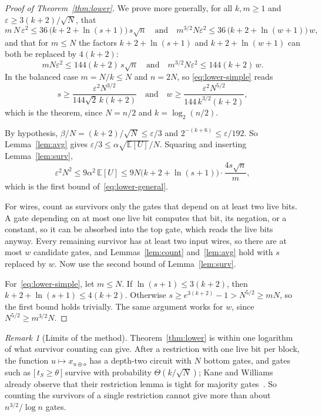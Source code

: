 \documentclass[11pt,letterpaper]{article}
\theoremstyle{remark}
\newtheorem*{remark}{Remark}
\newcommand{\ind}[1]{\bigl[\,#1\,\bigr]}
\begin{document}
\begin{proof}[Proof of Theorem~\ref{thm:lower}]
We prove more generally, for all $k,m\ge1$ and
$\varepsilon\ge3(k+2)/\sqrt N$, that
\begin{equation}\label{eq:lower-general}
m\,N\,\varepsilon^2\le 36\,\bigl(k+2+\ln(s+1)\bigr)\,s\sqrt n
\quad\text{and}\quad
m^{3/2}N\varepsilon^2\le 36\,\bigl(k+2+\ln(w+1)\bigr)\,w ,
\end{equation}
and that for $m\le N$ the factors $k+2+\ln(s+1)$ and $k+2+\ln(w+1)$ can
both be replaced by $4(k+2)$:
\begin{equation}\label{eq:lower-simple}
mN\varepsilon^2\le144(k+2)\,s\sqrt n
\quad\text{and}\quad
m^{3/2}N\varepsilon^2\le144(k+2)\,w .
\end{equation}
In the balanced case $m=N/k\le N$ and $n=2N$, so \eqref{eq:lower-simple}
reads
\[
s\ge\frac{\varepsilon^2N^{3/2}}{144\sqrt2\,k(k+2)}
\quad\text{and}\quad
w\ge\frac{\varepsilon^2N^{5/2}}{144\,k^{3/2}(k+2)},
\]
which is the theorem, since $N=n/2$ and $k=\log_2(n/2)$.

By hypothesis, $\beta/N=(k+2)/\sqrt N\le\varepsilon/3$ and
$2^{-(k+6)}\le\varepsilon/192$. So Lemma~\ref{lem:avg} gives
$\varepsilon/3\le\alpha\sqrt{\mathbb E[U]}/N$. Squaring and inserting
Lemma~\ref{lem:surv},
\[
\varepsilon^2N^2\le9\alpha^2\,\mathbb E[U]\le
9N\bigl(k+2+\ln(s+1)\bigr)\cdot\frac{4s\sqrt n}{m},
\]
which is the first bound of~\eqref{eq:lower-general}.

For wires, count as survivors only the gates that depend on at least two
live bits. A gate depending on at most one live bit computes that bit, its
negation, or a constant, so it can be absorbed into the top gate, which reads
the live bits anyway. Every remaining survivor has at least two input wires,
so there are at most $w$ candidate gates, and Lemmas~\ref{lem:count}
and~\ref{lem:avg} hold with $s$ replaced by $w$. Now use the second bound of
Lemma~\ref{lem:surv}.

For~\eqref{eq:lower-simple}, let $m\le N$. If $\ln(s+1)\le3(k+2)$, then $k+2+\ln(s+1)\le4(k+2)$.
Otherwise $s\ge e^{3(k+2)}-1>N^{5/2}\ge mN$, so the first bound holds
trivially. The same argument works for $w$, since $N^{5/2}\ge m^{3/2}N$.
\end{proof}

\begin{remark}[Limits of the method]
Theorem~\ref{thm:lower} is within one logarithm of what survivor counting
can give. After a restriction with one live bit per block, the function
$u\mapsto x_{u\oplus o}$ has a depth-two circuit with $N$ bottom gates, and
gates such as $\ind{t_S\ge\theta}$ survive with probability
$\Theta(k/\sqrt N)$; Kane and Williams already observe that their
restriction lemma is tight for majority gates~\cite[Section~3]{KW}. So
counting the survivors of a single restriction cannot give more than about
$n^{3/2}/\log n$ gates.
\end{remark}
\end{document}

